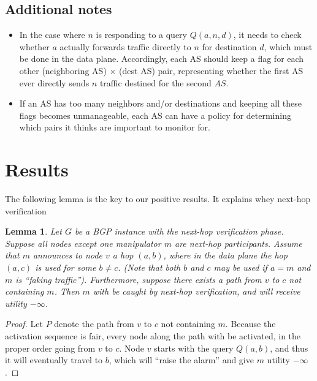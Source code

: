 \documentclass[10pt]{article}
\newtheorem{lemma}{Lemma}
\begin{document}
  \subsection{Additional notes}
  \begin{itemize}
    \item In the case where $n$ is responding to a query $Q(a,n,d)$, it needs to
      check whether $a$ actually forwards traffic directly to $n$ for
      destination $d$, which must be done in the data plane. Accordingly, each
      AS should keep a flag for each other (neighboring AS) $\times$ (dest AS)
      pair, representing whether the first AS ever directly sends $n$ traffic
      destined for the second $AS$.
    \item If an AS has too many neighbors and/or destinations and keeping all
      these flags becomes unmanageable, each AS can have a policy for
      determining which pairs it thinks are important to monitor for.
  \end{itemize}

\section{Results}

  The following lemma is the key to our positive results.
  It explains whey next-hop verification
  \begin{lemma}
    Let $G$ be a BGP instance with the next-hop verification phase.
    Suppose all nodes except one manipulator $m$ are next-hop participants.
    Assume that $m$ announces to node $v$ a hop $(a,b)$, where in the data plane the
    hop $(a,c)$ is used for some $b\ne c$.
    (Note that both $b$ and $c$ may be used if $a=m$ and $m$ is ``faking traffic'').
    Furthermore, suppose there exists a path from $v$ to $c$ not containing $m$.
    Then $m$ with be caught by next-hop verification, and will
    receive utility $-\infty$.
  \end{lemma}
  \begin{proof}
    Let $P$ denote the path from $v$ to $c$ not containing $m$.
    Because the activation sequence is fair, every node along the path with
    be activated, in the proper order going from $v$ to $c$.
    Node $v$ starts with the query $Q(a,b)$, and thus it will eventually travel
    to $b$, which will ``raise the alarm'' and give $m$ utility $-\infty$.
  \end{proof}
\end{document}
